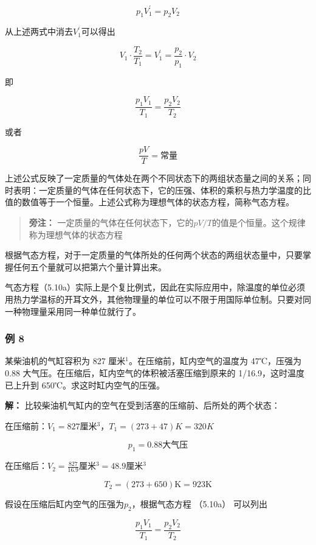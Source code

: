 \[
p_1V_1^\prime=p_2V_2
\]

从上述两式中消去\(V_{1}^{\prime}\)可以得出

\[
V _ {1} \cdot \frac {T _ {2}}{T _ {1}} = V _ {1} ^ {\prime} = \frac {p _ {2}}{p _ {1}} \cdot V _ {2}
\]

即

\[
\frac {p _ {1} V _ {1}}{T _ {1}} = \frac {p _ {2} V _ {2}}{T _ {2}} \tag {5.10a}
\]

或者

\[
\frac{pV}{T}=\text{常量} \tag{5.10b}
\]

上述公式反映了一定质量的气体处在两个不同状态下的两组状态量之间的关系；同时表明：一定质量的气体在任何状态下，它的压强、体积的乘积与热力学温度的比值的数值等于一个恒量。上述公式称为理想气体的状态方程，简称气态方程。

\begin{quote}
\textbf{旁注：}
一定质量的气体在任何状态下，它的\(pV / T\)的值是个恒量。这个规律称为理想气体的状态方程
\end{quote}

根据气态方程，对于一定质量的气体所处的任何两个状态的两组状态量中，只要掌握任何五个量就可以把第六个量计算出来。

气态方程（5.10a）实际上是个复比例式，因此在实际应用中，除温度的单位必须用热力学温标的开耳文外，其他物理量的单位可以不限于用国际单位制。只要对同一种物理量采用同一种单位就行了。

\subsubsection{例 8}\label{ux4f8b-8-2}

某柴油机的气缸容积为 827 厘米\(^{1}\)。在压缩前，缸内空气的温度为
47℃，压强为 0.88 大气压。在压缩后，缸内空气的体积被活塞压缩到原来的
1/16.9，这时温度已上升到 650℃。求这时缸内空气的压强。

\textbf{解：}
比较柴油机气缸内的空气在受到活塞的压缩前、后所处的两个状态：

在压缩前：\(V_{1}=827\)厘米\(^{3}\)，\(T_{1}=(273+47)K=320K\)

\[
p _ {1} = 0.88 \text{大气压}
\]

在压缩后：\(V_{2}=\frac{827}{16.9}\)厘米\(^{3}=48.9\)厘米\(^{3}\)

\[
T _ {2} = (273 + 650) \mathrm{K} = 923 \mathrm{K}
\]

假设在压缩后缸内空气的压强为\(p_2\)，根据气态方程 （5.10a） 可以列出

\[
\frac {p _ {1} V _ {1}}{T _ {1}} = \frac {p _ {2} V _ {2}}{T _ {2}}
\]

